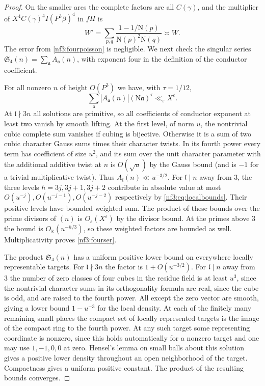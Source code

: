 \documentclass[11pt,letterpaper]{article}
\theoremstyle{definition}
\numberwithin{equation}{section}
\begin{document}
\begin{proof}
On the smaller arcs the complete factors are all $C(\gamma)$, and the
multiplier of $X^4 C(\gamma)^4I(P^3\beta)^4$ in $fH$ is
\[
          W'=\sum_{p,q}\frac{1-1/\mathrm N(p)}
                              {\mathrm N(p)^2\mathrm N(q)}\asymp W .
\]
The error from \eqref{nf3:fourpoisson} is negligible. We next check the
singular series $\mathfrak S_4(n)=\sum_{\mathfrak a} A_{\mathfrak a}(n)$,
with exponent four in the definition of the conductor coefficient.

For all nonzero $n$ of height $O(P^3)$ we have, with $\tau=1/12$,
\begin{equation}\label{nf3:fourser}
  \sum_{\mathfrak a}|A_{\mathfrak a}(n)|(\mathrm N\mathfrak a)^\tau
       \ll_\varepsilon X^\varepsilon .
\end{equation}
At $\mathfrak l\nmid 3n$ all solutions are primitive, so all coefficients
of conductor exponent at least two vanish by smooth lifting. At the
first level, of norm $u$, the nontrivial cubic complete sum vanishes
if cubing is bijective. Otherwise it is a sum of two cubic character
Gauss sums times their character twists. In its fourth power every
term has coefficient of size $u^2$, and its sum over the unit character
parameter with the additional additive twist at $n$ is $O(\sqrt u)$
by the Gauss bound (and is $-1$ for a trivial multiplicative twist).
Thus $A_{\mathfrak l}(n)\ll u^{-3/2}$. For $\mathfrak l\mid n$ away
from $3$, the three levels $h=3j,3j+1,3j+2$ contribute in absolute
value at most $O(u^{-j}),O(u^{-j-1}),O(u^{-j-2})$ respectively by
\eqref{nf3:eq:localbounds}. Their positive levels have bounded
weighted sum. The product of these bounds over the prime divisors of
$(n)$ is $O_\varepsilon(X^\varepsilon)$ by the divisor bound. At the
primes above $3$ the bound is $O_{\mathbb K}(u^{-h/3})$, so these weighted
factors are bounded as well. Multiplicativity proves \eqref{nf3:fourser}.

The product $\mathfrak S_4(n)$ has a uniform positive lower bound on
everywhere locally representable targets. For $\mathfrak l\nmid3n$ the
factor is $1+O(u^{-3/2})$. For $\mathfrak l\mid n$ away from $3$
the number of zero classes of four cubes in the residue field is at
least $u^3$, since the nontrivial character sums in its orthogonality formula
are real, since the cube is odd, and are raised to the fourth power.
All except the zero vector are smooth, giving a lower bound $1-u^{-3}$
for the local density. At each of the finitely many remaining small
places the compact set of locally represented targets is the image
of the compact ring to the fourth power. At any such target some
representing coordinate is nonzero, since this holds automatically for a
nonzero target and one may use $1,-1,0,0$ at zero. Hensel's lemma
on small balls about this solution gives a positive lower density
throughout an open neighborhood of the target. Compactness gives a
uniform positive constant. The product of the resulting bounds converges.


\end{proof}
\end{document}
